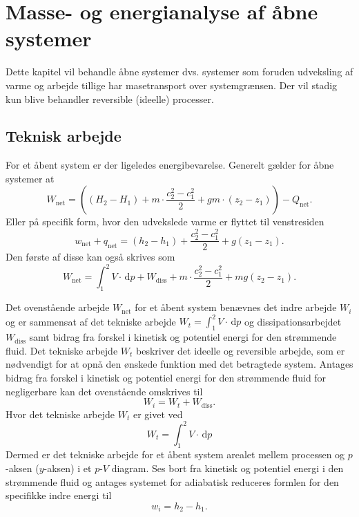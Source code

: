 
\section{Masse- og energianalyse af åbne systemer}
Dette kapitel vil behandle åbne systemer dvs. systemer som foruden udveksling af varme og arbejde tillige har masetransport over systemgrænsen. Der vil stadig kun blive behandler reversible (ideelle) processer. 

\subsection{Teknisk arbejde}
For et åbent system er der ligeledes energibevarelse. Generelt gælder for åbne systemer at
\[ 
W_{\text{net}} = \left( \left( H_2 - H_1 \right) + m \cdot \frac{c_2^2 - c_1^2}{2} + gm\cdot \left( z_2 - z_1 \right) \right) - Q_{\text{net}}
.\]
Eller på specifik form, hvor den udvekslede varme er flyttet til venstresiden
\[ 
w_{\text{net}} + q_{\text{net}} = \left( h_2 - h_1 \right) + \frac{c_2^2 - c_1^2}{2} + g \left( z_1 - z_1 \right)
.\]
Den første af disse kan også skrives som
\[ 
W_{\text{net}} = \int_{1}^{2} V \cdot \, \mathrm{d}p + W_{\text{diss}} + m \cdot \frac{c_2^2 - c_1^2}{2} + mg \left( z_2 - z_1 \right)
.\]

Det ovenstående arbejde $W_{\text{net}}$ for et åbent system benævnes det indre arbejde $W_i$ og er sammensat af det tekniske arbejde $W_t = \int_{1}^{2} V\cdot \, \mathrm{d}p$ og dissipationsarbejdet $W_{\text{diss}}$ samt bidrag fra forskel i kinetisk og potentiel energi for den strømmende fluid. Det tekniske arbejde $W_t$ beskriver det ideelle og reversible arbejde, som er nødvendigt for at opnå den ønskede funktion med det betragtede system. Antages bidrag fra forskel i kinetisk og potentiel energi for den strømmende fluid for negligerbare kan det ovenstående omskrives til
\[ 
W_i = W_t + W_{\text{diss}}
.\]
Hvor det tekniske arbejde $W_t$ er givet ved
\begin{equation} \label{eq:teknisk}
  W_t = \int_{1}^{2} V \cdot \, \mathrm{d}p
\end{equation}
Dermed er det tekniske arbejde for et åbent system arealet mellem processen og $p$-aksen ($y$-aksen) i et $p$-$V$ diagram. Ses bort fra kinetisk og potentiel energi i den strømmende fluid og antages systemet for adiabatisk reduceres formlen for den specifikke indre energi til
\[ 
w_i = h_2 - h_1
.\]

